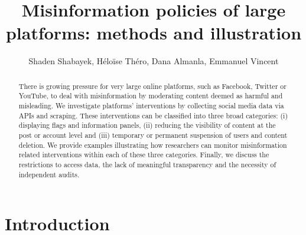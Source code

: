 \documentclass[Afour,sageh,times]{sagej}
\begin{document}

\title{Misinformation policies of large platforms: methods and illustration}

\author{Shaden Shabayek, H\'{e}lo\"{i}se Th\'{e}ro, Dana Almanla, Emmanuel Vincent}




\begin{abstract}
There is growing pressure for very large online platforms, such as Facebook, Twitter or YouTube, to deal with misinformation by moderating content deemed as harmful and misleading. We investigate platforms' interventions by collecting social media data via APIs and scraping. These interventions can be classified into three broad categories: (i) displaying flags and information panels,  (ii) reducing the visibility of content at the post or account level and (iii) temporary or permanent suspension of users and content deletion. We provide examples illustrating how researchers can monitor misinformation related interventions within each of these three categories. Finally, we discuss the restrictions to access data, the lack of meaningful transparency and the necessity of independent audits.
\end{abstract}


\maketitle

\section{Introduction}
\end{document}
